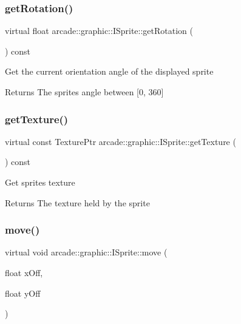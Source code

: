 \subsubsection{\texorpdfstring{getRotation()}{getRotation()}}
{\footnotesize\ttfamily virtual float arcade\+::graphic\+::\+I\+Sprite\+::get\+Rotation (\begin{DoxyParamCaption}{ }\end{DoxyParamCaption}) const\hspace{0.3cm}{\ttfamily [pure virtual]}}

Get the current orientation angle of the displayed sprite \begin{DoxyReturn}{Returns}
The sprite\textquotesingle{}s angle between \mbox{[}0, 360\mbox{]} 
\end{DoxyReturn}
\mbox{\label{classarcade_1_1graphic_1_1_i_sprite_a7e2a1006497060ad69d01055c2308967}} 
\subsubsection{\texorpdfstring{getTexture()}{getTexture()}}
{\footnotesize\ttfamily virtual const Texture\+Ptr arcade\+::graphic\+::\+I\+Sprite\+::get\+Texture (\begin{DoxyParamCaption}{ }\end{DoxyParamCaption}) const\hspace{0.3cm}{\ttfamily [pure virtual]}}

Get sprite\textquotesingle{}s texture \begin{DoxyReturn}{Returns}
The texture held by the sprite 
\end{DoxyReturn}
\mbox{\label{classarcade_1_1graphic_1_1_i_sprite_ae311414d5a500f18d66a201cc0063681}} 
\subsubsection{\texorpdfstring{move()}{move()}}
{\footnotesize\ttfamily virtual void arcade\+::graphic\+::\+I\+Sprite\+::move (\begin{DoxyParamCaption}\item[{float}]{x\+Off,  }\item[{float}]{y\+Off }\end{DoxyParamCaption})\hspace{0.3cm}{\ttfamily [pure virtual]}}

